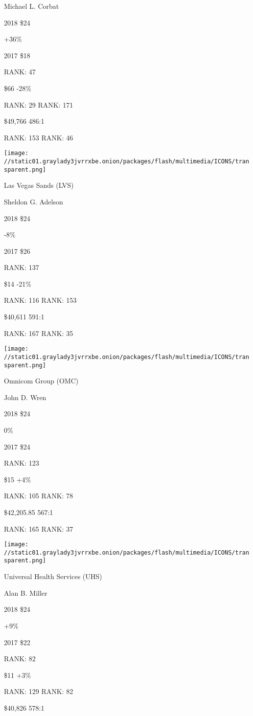 Michael L. Corbat \protect\hyperlink{g-footnotes}{}

2018 \$24

 +36\%

2017 \$18

RANK: 47

 \$66 -28\%

RANK: 29 RANK: 171

 \$49,766 486:1

RANK: 153 RANK: 46

\texttt{[image: //static01.graylady3jvrrxbe.onion/packages/flash/multimedia/ICONS/transparent.png]}

Las Vegas Sands (LVS)

Sheldon G. Adelson \protect\hyperlink{g-footnotes}{}

2018 \$24

 -8\%

2017 \$26

RANK: 137

 \$14 -21\%

RANK: 116 RANK: 153

 \$40,611 591:1

RANK: 167 RANK: 35

\texttt{[image: //static01.graylady3jvrrxbe.onion/packages/flash/multimedia/ICONS/transparent.png]}

Omnicom Group (OMC)

John D. Wren \protect\hyperlink{g-footnotes}{}

2018 \$24

 0\%

2017 \$24

RANK: 123

 \$15 +4\%

RANK: 105 RANK: 78

 \$42,205.85 567:1

RANK: 165 RANK: 37

\texttt{[image: //static01.graylady3jvrrxbe.onion/packages/flash/multimedia/ICONS/transparent.png]}

Universal Health Services (UHS)

Alan B. Miller \protect\hyperlink{g-footnotes}{}

2018 \$24

 +9\%

2017 \$22

RANK: 82

 \$11 +3\%

RANK: 129 RANK: 82

 \$40,826 578:1


